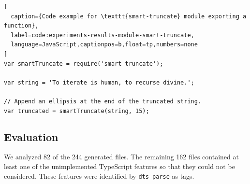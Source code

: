 \documentclass[english,cleveref,autoref,submission]{programming}
\begin{document}
\begin{lstlisting}[
  caption={Code example for \texttt{smart-truncate} module exporting a function},
  label=code:experiments-results-module-smart-truncate,
  language=JavaScript,captionpos=b,float=tp,numbers=none
]
var smartTruncate = require('smart-truncate');

var string = 'To iterate is human, to recurse divine.';

// Append an ellipsis at the end of the truncated string.
var truncated = smartTruncate(string, 15);
\end{lstlisting}

\subsection{Evaluation}
\label{sec:experiments-evaluation}
We analyzed 82 of the 244 generated files. The remaining 162 files contained at least one
of the unimplemented TypeScript features so that they could not be considered. These
features were identified by \texttt{dts-parse} as tags. 
\end{document}
